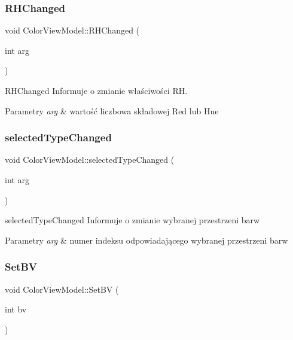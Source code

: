 \subsubsection{\texorpdfstring{R\+H\+Changed}{RHChanged}}
{\footnotesize\ttfamily void Color\+View\+Model\+::\+R\+H\+Changed (\begin{DoxyParamCaption}\item[{int}]{arg }\end{DoxyParamCaption})\hspace{0.3cm}{\ttfamily [signal]}}



R\+H\+Changed Informuje o zmianie właściwości RH. 


\begin{DoxyParams}{Parametry}
{\em arg} & wartość liczbowa składowej Red lub Hue \\
\hline
\end{DoxyParams}
\mbox{\label{class_color_view_model_a40e736b58e641078c43dcf146a4b53bd}} 
\subsubsection{\texorpdfstring{selected\+Type\+Changed}{selectedTypeChanged}}
{\footnotesize\ttfamily void Color\+View\+Model\+::selected\+Type\+Changed (\begin{DoxyParamCaption}\item[{int}]{arg }\end{DoxyParamCaption})\hspace{0.3cm}{\ttfamily [signal]}}



selected\+Type\+Changed Informuje o zmianie wybranej przestrzeni barw 


\begin{DoxyParams}{Parametry}
{\em arg} & numer indeksu odpowiadającego wybranej przestrzeni barw \\
\hline
\end{DoxyParams}
\mbox{\label{class_color_view_model_a07fbf050b15842e8e68c32c44ef9c6dd}} 
\subsubsection{\texorpdfstring{Set\+BV}{SetBV}}
{\footnotesize\ttfamily void Color\+View\+Model\+::\+Set\+BV (\begin{DoxyParamCaption}\item[{int}]{bv }\end{DoxyParamCaption})\hspace{0.3cm}{\ttfamily [slot]}}



